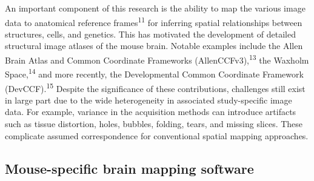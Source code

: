 \documentclass[
  12pt,
]{article}
\begin{document}
An important component of this research is the ability to map the
various image data to anatomical reference frames\textsuperscript{11}
for inferring spatial relationships between structures, cells, and
genetics. This has motivated the development of detailed structural
image atlases of the mouse brain. Notable examples include the Allen
Brain Atlas and Common Coordinate Frameworks
(AllenCCFv3),\textsuperscript{13} the Waxholm Space,\textsuperscript{14}
and more recently, the Developmental Common Coordinate Framework
(DevCCF).\textsuperscript{15} Despite the significance of these
contributions, challenges still exist in large part due to the wide
heterogeneity in associated study-specific image data. For example,
variance in the acquisition methods can introduce artifacts such as
tissue distortion, holes, bubbles, folding, tears, and missing slices.
These complicate assumed correspondence for conventional spatial mapping
approaches.

\hypertarget{mouse-specific-brain-mapping-software}{%
\subsection{Mouse-specific brain mapping
software}\label{mouse-specific-brain-mapping-software}}
\end{document}

